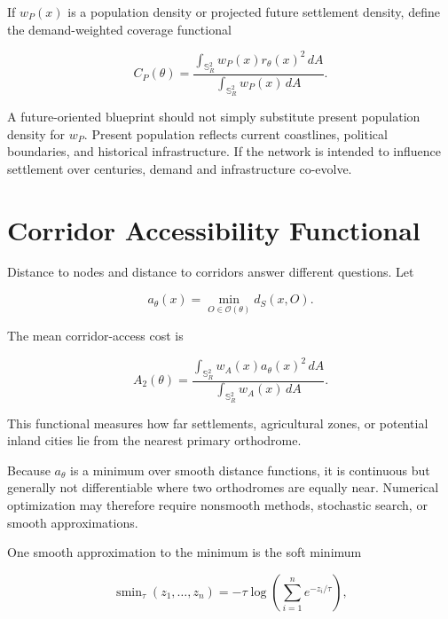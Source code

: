 \documentclass[11pt,fleqn]{book}
\numberwithin{equation}{chapter}
\theoremstyle{plain}
\theoremstyle{definition}
\theoremstyle{remark}
\newcommand{\Sphere}{\mathbb{S}^{2}}
\newcommand{\Oset}{\mathcal{O}}
\begin{document}
If \(w_P(x)\) is a population density or projected future settlement density, define the demand-weighted coverage functional

\begin{equation}
    C_P(\theta)
    =
    \frac{
      \int_{\Sphere_R}
      w_P(x)r_\theta(x)^2\,dA
    }{
      \int_{\Sphere_R}
      w_P(x)\,dA
    }.
\end{equation}

A future-oriented blueprint should not simply substitute present population density for \(w_P\). Present population reflects current coastlines, political boundaries, and historical infrastructure. If the network is intended to influence settlement over centuries, demand and infrastructure co-evolve.

\section{Corridor Accessibility Functional}

Distance to nodes and distance to corridors answer different questions. Let

\begin{equation}
    a_\theta(x)
    =
    \min_{O\in\Oset(\theta)}
    d_S(x,O).
\end{equation}

The mean corridor-access cost is

\begin{equation}
    A_2(\theta)
    =
    \frac{
      \int_{\Sphere_R}
      w_A(x)a_\theta(x)^2\,dA
    }{
      \int_{\Sphere_R}
      w_A(x)\,dA
    }.
\end{equation}

This functional measures how far settlements, agricultural zones, or potential inland cities lie from the nearest primary orthodrome.

Because \(a_\theta\) is a minimum over smooth distance functions, it is continuous but generally not differentiable where two orthodromes are equally near. Numerical optimization may therefore require nonsmooth methods, stochastic search, or smooth approximations.

One smooth approximation to the minimum is the soft minimum

\begin{equation}
    \operatorname{smin}_{\tau}
    (z_1,\dots,z_n)
    =
    -\tau
    \log\left(
      \sum_{i=1}^{n}
      e^{-z_i/\tau}
    \right),
\end{equation}
\end{document}
